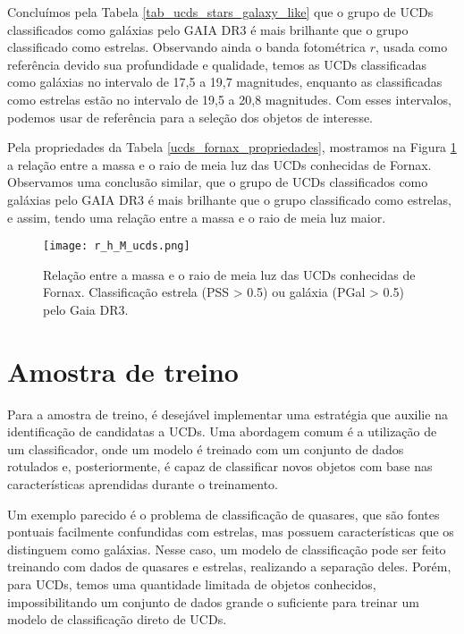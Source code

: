 \vspace{\baselineskip}

Concluímos pela Tabela \ref{tab_ucds_stars_galaxy_like} que o grupo de UCDs classificados como galáxias pelo GAIA DR3 é mais brilhante que o grupo classificado como estrelas. Observando ainda o banda fotométrica $r$, usada como referência devido sua profundidade e qualidade, temos as UCDs classificadas como galáxias no intervalo de 17,5 a 19,7 magnitudes, enquanto as classificadas como estrelas estão no intervalo de 19,5 a 20,8 magnitudes. Com esses intervalos, podemos usar de referência para a seleção dos objetos de interesse.

\vspace{\baselineskip}

Pela propriedades da Tabela \ref{ucds_fornax_propriedades}, mostramos na Figura \ref{r_h_M_ucds} a relação entre a massa e o raio de meia luz das UCDs conhecidas de Fornax. Observamos uma conclusão similar, que o grupo de UCDs classificados como galáxias pelo GAIA DR3 é mais brilhante que o grupo classificado como estrelas, e assim, tendo uma relação entre a massa e o raio de meia luz maior.


\begin{figure}[!ht]
    \centering
    \texttt{[image: r\_h\_M\_ucds.png]}
    \caption[]{Relação entre a massa e o raio de meia luz das UCDs conhecidas de Fornax. Classificação estrela (PSS > 0.5) ou galáxia (PGal > 0.5) pelo Gaia DR3.}
    \label{r_h_M_ucds}
\end{figure}



\section{Amostra de treino}
Para a amostra de treino, é desejável implementar uma estratégia que auxilie na identificação de candidatas a UCDs. Uma abordagem comum é a utilização de um classificador, onde um modelo é treinado com um conjunto de dados rotulados e, posteriormente, é capaz de classificar novos objetos com base nas características aprendidas durante o treinamento.

\vspace{\baselineskip}

Um exemplo parecido é o problema de classificação de quasares, que são fontes pontuais facilmente confundidas com estrelas, mas possuem características que os distinguem como galáxias. Nesse caso, um modelo de classificação pode ser feito treinando com dados de quasares e estrelas, realizando a separação deles. Porém, para UCDs, temos uma quantidade limitada de objetos conhecidos, impossibilitando um conjunto de dados grande o suficiente para treinar um modelo de classificação direto de UCDs.

